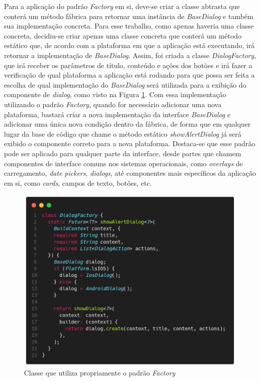 \documentclass[12pt, %
openright, 
oneside, %
a4paper,    %
brazil]{facom-ufu-abntex2}
\begin{document}
Para a aplicação do padrão \textit{Factory} em si, deve-se criar a classe abtrasta que conterá um método fábrica para retornar uma instância de \textit{BaseDialog} e também sua implementação concreta. Para esse trabalho, como apenas haveria uma classe concreta, decidiu-se criar apenas uma classe concreta que conterá um método estático que, de acordo com a plataforma em que a aplicação está executando, irá retornar a implementação de \textit{BaseDialog}. Assim, foi criada a classe \textit{DialogFactory}, que irá receber os parâmetros de título, conteúdo e ações dos botões e irá fazer a verificação de qual plataforma a aplicação está rodando para que possa ser feita a escolha de qual implementação do \textit{BaseDialog} será utilizada para a exibição do componente de \textit{dialog}, como visto na Figura \ref{fig:dialog_factory}. Com essa implementação utilizando o padrão \textit{Factory}, quando for necessário adicionar uma nova plataforma, bastará criar a nova implementação da interface \textit{BaseDialog} e adicionar uma única nova condição dentro da fábrica, de forma que em qualquer lugar da base de código que chame o método estático \textit{showAlertDialog} já será exibido o componente correto para a nova plataforma. Destaca-se que esse padrão pode ser aplicado para qualquer parte da interface, desde partes que chamem componentes de interface comuns nos sistemas operacionais, como \textit{overlays} de carregamento, \textit{date pickers}, \textit{dialogs}, até componentes mais específicos da aplicação em si, como \textit{cards}, campos de texto, botões, etc.

\begin{figure}[ht]
    \centering
    \includegraphics[width=.75\textwidth, trim={0 30 0 100}, clip]{figures/dialog/dialog_factory.png}
    \caption{Classe que utiliza propriamente o padrão \textit{Factory}}
    \label{fig:dialog_factory}
\end{figure}
\end{document}
